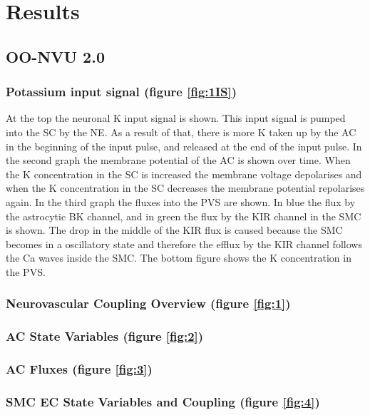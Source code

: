 %
	\section{Results}
	\subsection {OO-NVU 2.0}
	\subsubsection*{Potassium input signal (figure \ref{fig:1IS})}
	At the top the neuronal \gls{K} input signal is shown. This input signal is pumped into the SC by the \gls{NE}. As a result of that, there is more \gls{K} taken up by the \gls{AC} in the beginning of the input pulse, and released at the end of the input pulse. In the second graph the membrane potential of the AC is shown over time. When the \gls{K} concentration in the SC is increased the membrane voltage depolarises and when the \gls{K} concentration in the SC decreases the membrane potential repolarises again.
	In the third graph the fluxes into the PVS are shown. In blue the flux by the astrocytic BK channel, and in green the flux by the KIR channel in the SMC is shown. The drop in the middle of the KIR flux is caused because the SMC becomes in a oscillatory state and therefore the efflux by the KIR channel follows the \gls{Ca} waves inside the SMC.
	The bottom figure shows the \gls{K} concentration in the PVS.
	
	\subsubsection*{Neurovascular Coupling Overview (figure \ref{fig:1})}
	
	\subsubsection*{AC State Variables (figure \ref{fig:2})}
	
	\subsubsection*{AC Fluxes (figure \ref{fig:3})}
	
	\subsubsection*{SMC EC State Variables and Coupling (figure \ref{fig:4})}
	
